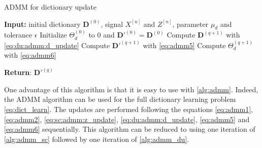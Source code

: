 \documentclass[../thesis.tex]{subfiles}
\begin{document}
	
	\begin{algorithm}[tp]
		\caption{ADMM for dictionary update}
		\label{alg:admm_du}
		\begin{algorithmic}[1]
			\STATE \textbf{Input: } initial dictionary $\pmb D^{(0)}$, signal $X^{[n]}$ and $Z^{[n]}$,
					parameter $\mu_d$ and tolerance $\epsilon$ 
			\STATE Initialize $\Theta_d^{(0)}$ to 0 and $\pmb D'^{(0)} = \pmb D^{(0)}$ 
			\REPEAT
			\STATE Compute $\pmb D^{(q+1)}$ with \autoref{eq:du:admm:d_update}
			\STATE Compute $\pmb D'^{(q+1)}$ with \autoref{eq:admm5} 
			\STATE Compute $\Theta_d^{(q+1)}$ with \autoref{eq:admm6} 
			
			\STATE \textbf{Return}: $\pmb D'^{(q)}$
		\end{algorithmic}
	\end{algorithm}
	
	One advantage of this algorithm is that it is easy to use with \autoref{alg:admm}.
	Indeed, the ADMM algorithm can be used for the full dictionary learning problem
	\autoref{eq:dict_learn}. The updates are performed following the equations
	\autoref{eq:admm1},\autoref{eq:admm2}, \autoref{eq:sc:admm:z_update}, \autoref{eq:du:admm:d_update},
	\autoref{eq:admm5} and \autoref{eq:admm6} sequentially. This algorithm can be
	reduced to using one iteration of \autoref{alg:admm_sc} followed by one iteration
	of \autoref{alg:admm_du}.
	
	







\biblio{}
\end{document}
